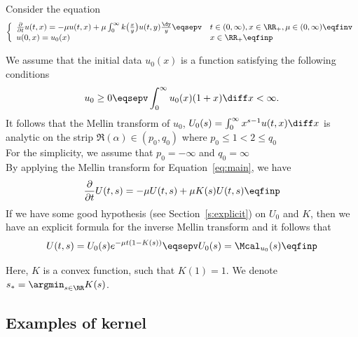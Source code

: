 Consider the equation
\begin{equation}\left\{
    \begin{array}{ll}
	\frac{\partial}{\partial t}u(t,x) = - \mu u(t,x) + \mu \int_{0}^{\infty} k\big( \frac{x}{y}\big)u(t,y) \frac{\dy}{y}
	\eqsepv
	& t \in (0, \infty), x \in \RR_+, \mu \in (0, \infty) \eqfinv
	\\
	u(0, x) = u_0(x)
	& x \in \RR_+
	\eqfinp
    \end{array}
	\right.
    \label{eq:main}
\end{equation}

We assume that the initial data $u_0(x)$ is a function satisfying the following conditions 
$$ u_0 \geq 0 \eqsepv \int_0^\infty u_0(x)(1+x)\diff x < \infty.$$
It follows that the Mellin transform of $u_0$, $U_0(s)= \int_0^\infty x^{s-1}u(t,x)\diff x$ is analytic on the strip $\Re(\alpha) \in (p_0,q_0)$ where $p_0 \leq 1 < 2 \leq q_0$ \\
For the simplicity, we assume that 
$ p_0=-\infty$ and $q_0 = \infty$\\

By applying the Mellin transform for Equation~\eqref{eq:main}, we have
	\begin{equation}
		\frac{\partial}{\partial t} U(t,s) = - \mu U(t,s) + \mu K(s) U(t,s)
		\eqfinp
        \label{eq:explicit_reconstruction}
	\end{equation}
If we have some good hypothesis (see Section~\ref{s:explicit}) on $U_0$ and $K$, then we have an explicit formula for the inverse Mellin transform and it follows that
    \begin{equation*}
        U(t,s) = U_0(s) e^{-\mu t(1 - K(s) ) }
        \eqsepv
        U_0(s) = \Mcal_{u_0}(s)
        \eqfinp
    \end{equation*}

Here, $K$ is a convex function, such that $K(1) = 1$. We denote $s_* = \argmin_{s\in \RR} K(s)$. 

\subsection{Examples of kernel}

